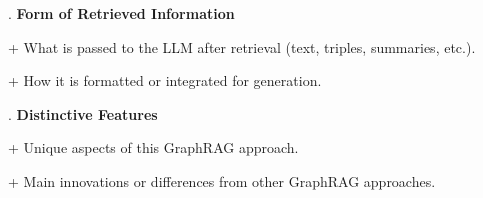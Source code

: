 \begin{tcolorbox}
. \textbf{Form of Retrieved Information}  \par\noindent
   + What is passed to the LLM after retrieval (text, triples, summaries, etc.). \par\noindent
   + How it is formatted or integrated for generation. \par\noindent

. \textbf{Distinctive Features}  \par\noindent
    + Unique aspects of this GraphRAG approach. \par\noindent
    + Main innovations or differences from other GraphRAG approaches. \par\noindent


\end{tcolorbox}
\label{fig:graphrag-summary-prompt}






